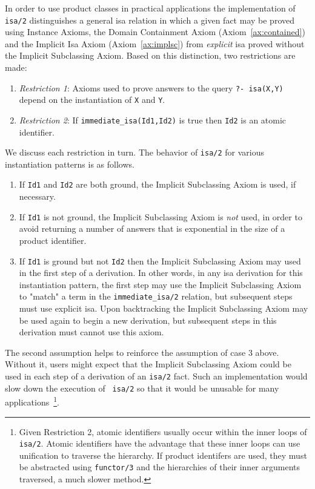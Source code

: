In order to use product classes in practical applications the
implementation of {\tt isa/2} distinguishes a general isa relation in
which a given fact may be proved using Instance Axioms, the Domain
Containment Axiom (Axiom~\ref{ax:contained}) and the Implicit Isa
Axiom (Axiom~\ref{ax:implsc}) from {\em explicit} isa proved without
the Implicit Subclassing Axiom.  Based on this distinction, two
restrictions are made:

\begin{enumerate}

\item {\em Restriction 1}: Axioms used to prove answers to the query
{\tt ?- isa(X,Y)} depend on the instantiation of {\tt X} and {\tt Y}.

\item {\em Restriction 2}: If {\tt immediate\_isa(Id1,Id2)} is true then
{\tt Id2} is an atomic identifier.
\end{enumerate}

We discuss each restriction in turn.  The behavior of {\tt isa/2} for
various instantiation patterns is as follows.

\begin{enumerate} 

\item If {\tt Id1} and {\tt Id2} are both ground, the Implicit
Subclassing Axiom is used, if necessary.

\item If {\tt Id1} is not ground, the Implicit Subclassing Axiom is
{\em not} used, in order to avoid returning a number of answers that
is exponential in the size of a product identifier.

\item If {\tt Id1} is ground but not {\tt Id2} then the Implicit
Subclassing Axiom may used in the first step of a derivation.  In
other words, in any isa derivation for this instantiation pattern, the
first step may use the Implicit Subclassing Axiom to "match" a term in
the {\tt immediate\_isa/2} relation, but subsequent steps must use
explicit isa.  Upon backtracking the Implicit Subclassing Axiom may be
used again to begin a new derivation, but subsequent steps in this
derivation must cannot use this axiom.
\end{enumerate}

The second assumption helps to reinforce the assumption of case 3
above.  Without it, users might expect that the Implicit Subclassing
Axiom could be used in each step of a derivation of an {\tt isa/2}
fact.  Such an implementation would slow down the execution of {\tt
isa/2} so that it would be unusable for many
applications~\footnote{Given Restriction 2, atomic identifiers usually
occur within the inner loops of {\tt isa/2}.  Atomic identifiers have
the advantage that these inner loops can use unification to traverse
the hierarchy.  If product identifers are used, they must be
abstracted using {\tt functor/3} and the hierarchies of their inner
arguments traversed, a much slower method.}.

